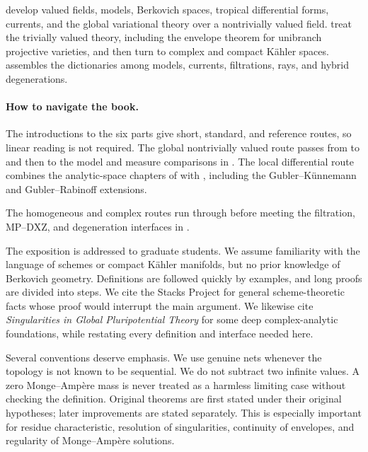  develop valued fields, models,
Berkovich spaces, tropical
differential forms, currents, and the global variational theory over a
nontrivially valued field.   treat the
trivially valued theory,
including the envelope theorem for unibranch projective varieties, and then
turn to complex and compact Kähler spaces.   assembles
the dictionaries among models, currents, filtrations, rays, and hybrid
degenerations.

\paragraph{How to navigate the book.}
\label{front:preface-navigation}
The introductions to the six parts give short, standard, and reference
routes, so linear reading is not required.  The global nontrivially valued
route passes from  to  and then to the
model and measure comparisons in .  The local
differential route combines the analytic-space chapters of
 with , including the
Gubler--K\"unnemann and Gubler--Rabinoff extensions.

The homogeneous and complex routes run through
 before meeting the filtration, MP--DXZ, and
degeneration interfaces in .

The exposition is addressed to graduate students.  We assume familiarity
with the language of schemes or compact Kähler manifolds, but no prior
knowledge of Berkovich geometry.  Definitions are followed quickly by
examples, and long proofs are divided into steps.  We cite the Stacks Project
for general scheme-theoretic facts whose proof would interrupt the main
argument.  We likewise cite \emph{Singularities in Global Pluripotential
Theory} for some deep complex-analytic foundations, while restating every
definition and interface needed here.

Several conventions deserve emphasis.  We use genuine nets whenever the
topology is not known to be sequential.  We do not subtract two infinite
values.  A zero Monge--Ampère mass is never treated as a harmless limiting
case without checking the definition.  Original theorems are first stated
under their original hypotheses; later improvements are stated separately.
This is especially important for residue characteristic, resolution of
singularities, continuity of envelopes, and regularity of Monge--Ampère
solutions.

